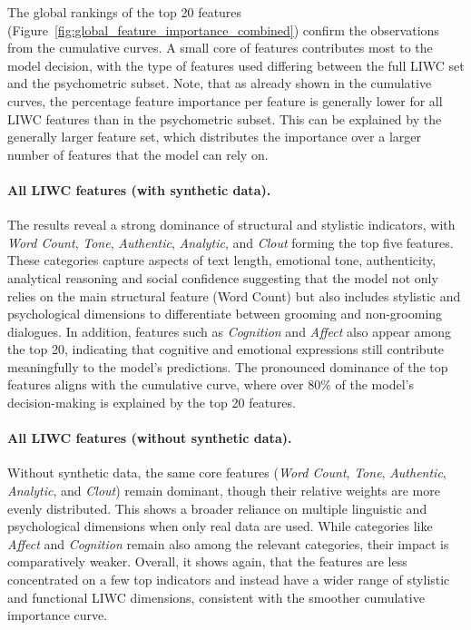 The global rankings of the top 20 features (Figure~\ref{fig:global_feature_importance_combined}) confirm the observations from the cumulative curves. A small core of features contributes most to the model decision, with the type of features used differing between the full LIWC set and the psychometric subset. Note, that as already shown in the cumulative curves, the percentage feature importance per feature is generally lower for all LIWC features than in the psychometric subset. This can be explained by the generally larger feature set, which distributes the importance over a larger number of features that the model can rely on.

\paragraph{All LIWC features (with synthetic data).}
The results reveal a strong dominance of structural and stylistic indicators, with \textit{Word Count}, \textit{Tone}, \textit{Authentic}, \textit{Analytic}, and \textit{Clout} forming the top five features. These categories capture aspects of text length, emotional tone, authenticity, analytical reasoning and social confidence suggesting that the model not only relies on the main structural feature (Word Count) but also includes stylistic and psychological dimensions to differentiate between grooming and non-grooming dialogues. In addition, features such as \textit{Cognition} and \textit{Affect} also appear among the top 20, indicating that cognitive and emotional expressions still contribute meaningfully to the model’s predictions. The pronounced dominance of the top features aligns with the cumulative curve, where over 80\% of the model’s decision-making is explained by the top 20 features.

\paragraph{All LIWC features (without synthetic data).}
Without synthetic data, the same core features (\textit{Word Count}, \textit{Tone}, \textit{Authentic}, \textit{Analytic}, and \textit{Clout}) remain dominant, though their relative weights are more evenly distributed. This shows a broader reliance on multiple linguistic and psychological dimensions when only real data are used. While categories like \textit{Affect} and \textit{Cognition} remain also among the relevant categories, their impact is comparatively weaker. Overall, it shows again, that the features are less concentrated on a few top indicators and instead have a wider range of stylistic and functional LIWC dimensions, consistent with the smoother cumulative importance curve.


